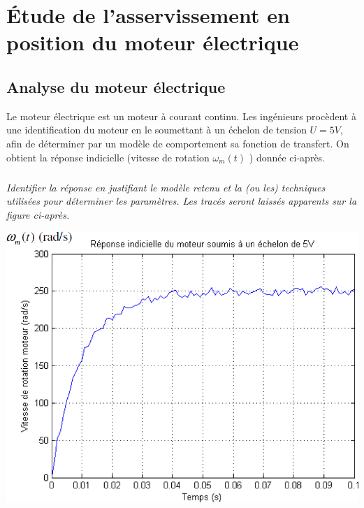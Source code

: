 \documentclass[11pt,oneside]{article}
\begin{document}
\section{\'Etude de l'asservissement en position du moteur électrique}
%
%

\subsection{Analyse du moteur électrique}
Le moteur électrique est un moteur à courant continu. Les ingénieurs procèdent à une identification du
moteur en le soumettant à un échelon de tension $U=5V$, afin de déterminer par un modèle de
comportement sa fonction de transfert. On obtient la réponse indicielle (vitesse de rotation $\omega_m(t)$ )
donnée ci-après.

\subparagraph{}
\textit{Identifier la réponse en justifiant le modèle retenu et la (ou les) techniques utilisées pour
déterminer les paramètres. Les tracés seront laissés apparents sur la figure ci-après.}


\begin{center}
\includegraphics[width=.8\textwidth]{png/image7}
\end{center}
\end{document}
